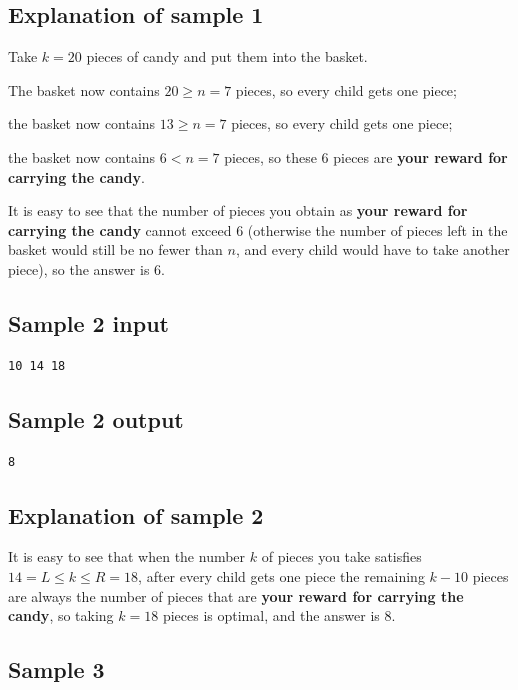 \documentclass[11pt]{article}
\begin{document}
\subsection*{Explanation of sample 1}

Take $k = 20$ pieces of candy and put them into the basket.

The basket now contains $20 \ge n = 7$ pieces, so every child gets one
piece;

the basket now contains $13 \ge n = 7$ pieces, so every child gets one
piece;

the basket now contains $6 < n = 7$ pieces, so these 6 pieces are
\textbf{your reward for carrying the candy}.

It is easy to see that the number of pieces you obtain as
\textbf{your reward for carrying the candy} cannot exceed 6
(otherwise the number of pieces left in the basket would still be no fewer
than $n$, and every child would have to take another piece),
so the answer is 6.

\subsection*{Sample 2 input}

\begin{verbatim}
10 14 18
\end{verbatim}

\subsection*{Sample 2 output}

\begin{verbatim}
8
\end{verbatim}

\subsection*{Explanation of sample 2}

It is easy to see that when the number $k$ of pieces you take satisfies
$14 = L \le k \le R = 18$,
after every child gets one piece the remaining $k - 10$ pieces are always
the number of pieces that are
\textbf{your reward for carrying the candy},
so taking $k = 18$ pieces is optimal, and the answer is 8.

\subsection*{Sample 3}
\end{document}

